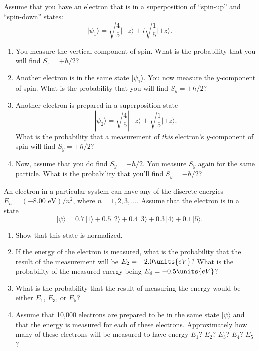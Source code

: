 
\begin{problem}
Assume that you have an electron that is in a superposition of
``spin-up'' and ``spin-down'' states:
\[ \vert\psi_1\rangle = \sqrt{\frac{4}{5}}\vert\mbox{$-z$}\rangle + i 
\sqrt{\frac{1}{5}}\vert\mbox{$+z$}\rangle.  \]
	\begin{enumerate}
	\item You measure the vertical component of spin. What is the
	probability that you will find $S_z = + \hbar/2$? 
	\item Another electron is in the same state $|\psi_1\rangle$.    You now measure the
	$y$-component of spin. What is the probability that you will find
	$S_y = + \hbar/2$?
	\item Another electron is prepared in a superposition state 
\[ |\psi_2\rangle = \sqrt{\frac{4}{5}} |\mbox{$-z$}\rangle + 
        \sqrt{\frac{1}{5}}\vert\mbox{$+z$}\rangle.  \]	
        What is the probability that a measurement of
	{\em this} electron's $y$-component of spin will find 
        $S_y = + \hbar/2$?
	\item Now, assume that you do find $S_y = + \hbar/2$. You measure $S_y$
	again for the same particle. What is the probability that you'll 
        find $S_y = -\hbar/2$?
        \end{enumerate}
\label{prob:spin_iv}
\end{problem}


\begin{problem}
An electron in a particular system can have any of the discrete
  energies $E_n = (-8.00\mbox{ eV})/n^2$, where $n = 1, 2, 3, \dots$. Assume
  that the electron is in a state 
  \[ |\psi\rangle = 0.7\,|1\rangle + 0.5\,|2\rangle + 0.4\,|3\rangle 
        + 0.3\,|4\rangle + 0.1\,|5\rangle.  \]
  \begin{enumerate}
  \item Show that this state is normalized.
  \item If the energy of the electron is measured, what is the probability that the result of the measurement will be $E_2 = -2.0\units{eV}$? What is the probability of the measured energy being $E_4 = -0.5\units{eV}$?
  \item What is the probability that the result of measuring the energy would be either $E_1$, $E_3$, or $E_5$?
  
  \item Assume that 10,000 electrons are prepared to be in the same
    state $|\psi\rangle$ and that the energy is measured for each of these electrons.  Approximately how many of these electrons will be measured to have energy $E_1$?  $E_2$?  $E_3$?  $E_4$?  $E_5$?
  
  \end{enumerate}
\label{prob:atomic_energies}
\end{problem}


